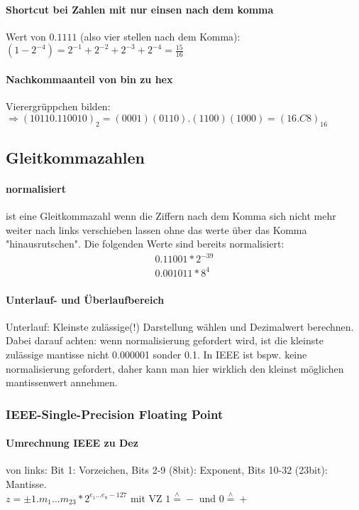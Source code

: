 \documentclass[a4paper]{article}
\begin{document}
\paragraph{Shortcut bei Zahlen mit nur einsen nach dem komma}
Wert von $0.1111$ (also vier stellen nach dem Komma): $(1-2^{-4}) = 2^{-1}+2^{-2}+2^{-3}+2^{-4} = \frac{15}{16}$

\paragraph{Nachkommaanteil von bin zu hex}
Vierergrüppchen bilden: $ \Rightarrow (10110.110010)_{2} = (0001)(0110).(1100)(1000) = (16.C8)_{16}$ 

\subsection{Gleitkommazahlen}
\paragraph{normalisiert} ist eine Gleitkommazahl wenn die Ziffern nach dem Komma sich nicht mehr weiter nach links verschieben lassen ohne das werte über das Komma "hinausrutschen". Die folgenden Werte sind bereits normalisiert:
\begin{eqnarray}
0.11001*2^{-39} \\
0.001011*8^4
\end{eqnarray}
\paragraph{Unterlauf- und Überlaufbereich}
Unterlauf: Kleinste zulässige(!) Darstellung wählen und Dezimalwert berechnen. Dabei darauf achten: wenn normalisierung gefordert wird, ist die kleinste zulässige mantisse nicht 0.000001 sonder 0.1. In IEEE ist bspw. keine normalisierung gefordert, daher kann man hier wirklich den kleinst möglichen mantissenwert annehmen.

\subsubsection{IEEE-Single-Precision Floating Point}

\paragraph{Umrechnung IEEE zu Dez} von links: Bit 1: Vorzeichen, Bits 2-9 (8bit): Exponent, Bits 10-32 (23bit): Mantisse.\\
{\Large $z = \pm1.m_1 ... m_{23}*2^{e_1 ... e_8-127}$ mit VZ $1 \stackrel{\wedge}{=} - $ und $0 \stackrel{\wedge}{=} +$} 
\\ 
\end{document}
